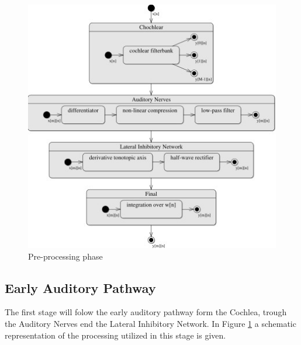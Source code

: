\documentclass{article}
\begin{document}
\begin{figure}
	\includegraphics{img/stage1.jpg}
	\caption{Pre-processing phase}
	\label{fig:stage1_1}
\end{figure}

\subsection{Early Auditory Pathway}
The first stage will folow the early auditory pathway form the Cochlea, trough the Auditory Nerves end the Lateral Inhibitory Network. In Figure \ref{fig:stage1_1} a schematic representation of the processing utilized in this stage is given.
\end{document}
